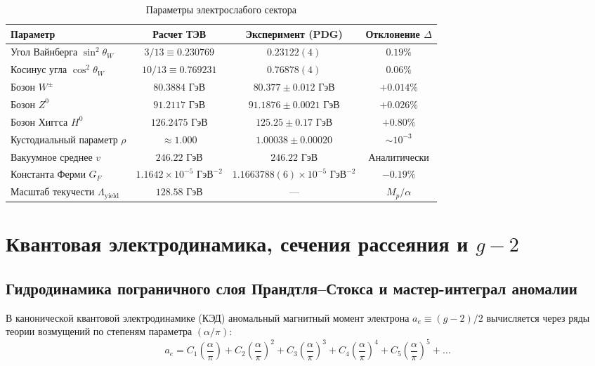 \documentclass[11pt,a4paper]{article}
\theoremstyle{definition}
\theoremstyle{remark}
\begin{document}
\begin{table}[H]
\centering
\small
\caption{Параметры электрослабого сектора}
\label{tab:electroweak}
\vspace{2mm}
\begin{tabular}{lccc}
\toprule
\textbf{Параметр} & \textbf{Расчет ТЭВ} & \textbf{Эксперимент (PDG)} & \textbf{Отклонение $\Delta$} \\
\midrule
Угол Вайнберга $\sin^2\theta_W$ & $3/13 \equiv 0.230769$ & $0.23122(4)$ & $0.19\%$ \\
Косинус угла $\cos^2\theta_W$ & $10/13 \equiv 0.769231$ & $0.76878(4)$ & $0.06\%$ \\
Бозон $W^\pm$ & $80.3884$ ГэВ & $80.377 \pm 0.012$ ГэВ & $+0.014\%$ \\
Бозон $Z^0$ & $91.2117$ ГэВ & $91.1876 \pm 0.0021$ ГэВ & $+0.026\%$ \\
Бозон Хиггса $H^0$ & $126.2475$ ГэВ & $125.25 \pm 0.17$ ГэВ & $+0.80\%$ \\
Кустодиальный параметр $\rho$ & $\approx 1.000$ & $1.00038 \pm 0.00020$ & $\sim 10^{-3}$ \\
Вакуумное среднее $v$ & $246.22$ ГэВ & $246.22$ ГэВ & Аналитически \\
Константа Ферми $G_F$ & $1.1642 \times 10^{-5}\text{ ГэВ}^{-2}$ & $1.1663788(6) \times 10^{-5}\text{ ГэВ}^{-2}$ & $-0.19\%$ \\
Масштаб текучести $\Lambda_{\mathrm{yield}}$ & $128.58$ ГэВ & --- & $M_p / \alpha$ \\
\bottomrule
\end{tabular}
\end{table}


\section{Квантовая электродинамика, сечения рассеяния и $g-2$}
\label{sec:qed_scattering}

\subsection{Гидродинамика пограничного слоя Прандтля--Стокса и мастер-интеграл аномалии}
В канонической квантовой электродинамике (КЭД) аномальный магнитный момент электрона $a_e \equiv (g-2)/2$ вычисляется через ряды теории возмущений по степеням параметра $(\alpha/\pi)$:
\begin{equation}
    a_e = C_1 \left(\frac{\alpha}{\pi}\right) + C_2 \left(\frac{\alpha}{\pi}\right)^2 + C_3 \left(\frac{\alpha}{\pi}\right)^3 + C_4 \left(\frac{\alpha}{\pi}\right)^4 + C_5 \left(\frac{\alpha}{\pi}\right)^5 + \dots
    \label{eq:qed_series}
\end{equation}
\end{document}
